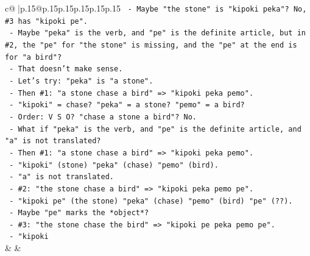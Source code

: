 \documentclass{article}
\begin{document}
{\begin{supertabular}{c@{$\;$}|p{.15\linewidth}@{}p{.15\linewidth}p{.15\linewidth}p{.15\linewidth}p{.15\linewidth}p{.15\linewidth}}
{{{\texttt{                                            {-} Maybe "the stone" is "kipoki peka"? No, \#3 has "kipoki pe".} \\
\texttt{                                            {-} Maybe "peka" is the verb, and "pe" is the definite article, but in \#2, the "pe" for "the stone" is missing, and the "pe" at the end is for "a bird"?} \\
\texttt{                                            {-} That doesn't make sense.} \\
\texttt{                                            {-} Let's try: "peka" is "a stone".} \\
\texttt{                                            {-} Then \#1: "a stone chase a bird" => "kipoki peka pemo".} \\
\texttt{                                              {-} "kipoki" = chase? "peka" = a stone? "pemo" = a bird?} \\
\texttt{                                              {-} Order: V S O? "chase a stone a bird"? No.} \\
\texttt{                                            {-} What if "peka" is the verb, and "pe" is the definite article, and "a" is not translated?} \\
\texttt{                                            {-} Then \#1: "a stone chase a bird" => "kipoki peka pemo".} \\
\texttt{                                              {-} "kipoki" (stone) "peka" (chase) "pemo" (bird).} \\
\texttt{                                              {-} "a" is not translated.} \\
\texttt{                                            {-} \#2: "the stone chase a bird" => "kipoki peka pemo pe".} \\
\texttt{                                              {-} "kipoki pe" (the stone) "peka" (chase) "pemo" (bird) "pe" (??).} \\
\texttt{                                              {-} Maybe "pe" marks the *object*?} \\
\texttt{                                              {-} \#3: "the stone chase the bird" => "kipoki pe peka pemo pe".} \\
\texttt{                                                {-} "kipoki} \\
            }
        }
    }
    & & \\ \\


\end{supertabular}}
\end{document}
